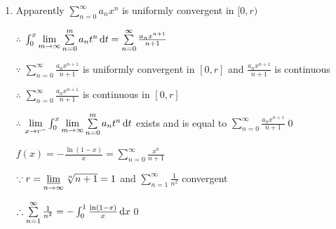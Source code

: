 \begin{enumerate}[1]
    \item
    Apparently $\sum\limits_{n=0}^\infty a_nx^n$ is uniformly convergent in $[0,r)$
    \par $\therefore$ $\int_0^x\lim\limits_{m\rightarrow{\infty}}\sum\limits_{n=0}^m a_nt^n\dif t=\sum\limits_{n=0}^\infty \frac{a_nx^{n+1}}{n+1}$
    \par $\because$ $\sum\limits_{n=0}^\infty \frac{a_nx^{n+1}}{n+1}$ is uniformly convergent in $[0,r]$ and $\frac{a_nx^{n+1}}{n+1}$ is continuous
    \par $\therefore$ $\sum\limits_{n=0}^\infty \frac{a_nx^{n+1}}{n+1}$ is continuous in $[0,r]$
    \par $\therefore$ $\lim\limits_{x\rightarrow{r^-}}\int_0^x\lim\limits_{m\rightarrow{\infty}}\sum\limits_{n=0}^m a_nt^n\dif t$ exists and is equal to $\sum\limits_{n=0}^\infty \frac{a_nx^{n+1}}{n+1} $\qed
    \par $f(x)=-\frac{\ln (1-x)}{x}=\sum\limits_{n=0}^\infty\frac{x^n}{n+1}$
    \par $\because r=\varliminf\limits_{n\rightarrow{\infty}}\sqrt[n]{n+1}=1$ and $\sum\limits_{n=1}^\infty\frac{1}{n^2}$ convergent
    \par $\therefore \sum\limits_{n=1}^\infty\frac{1}{n^2}=-\int_0^1 \frac{\ln (1-x)}{x}\dif x$\qed
    \end{enumerate}

\phantom{1}

